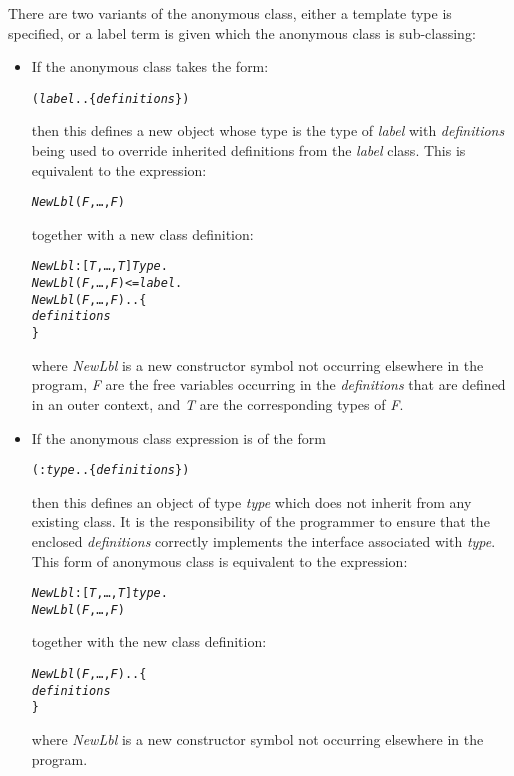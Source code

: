 There are two variants of the anonymous class, either a template type is specified, or a label term is given which the anonymous class is sub-classing:
\begin{itemize}
\item
If the anonymous class takes the form:
\begin{alltt}
(\emph{label}..\{ \emph{definitions} \})
\end{alltt}
then this defines a new object whose type is the type of \emph{label} with \emph{definitions} being used to override inherited definitions from the \emph{label} class. This is equivalent to the expression:
\begin{alltt}
\emph{NewLbl}(\emph{F},\ldots,\emph{F\subn})
\end{alltt}
together with a new class definition:
\begin{alltt}
\emph{NewLbl}:[\emph{T},\ldots,\emph{T}]\sconarrow{}\emph{Type}.
\emph{NewLbl}(\emph{F},\ldots,\emph{F\subn}) <= \emph{label}.
\emph{NewLbl}(\emph{F},\ldots,\emph{F\subn})..\{
  \emph{definitions}
\}
\end{alltt}
where \emph{NewLbl} is a new constructor symbol not occurring elsewhere in the program, \emph{F\subi} are the free variables occurring in the \emph{definitions} that are defined in an outer context, and \emph{T} are the corresponding types of \emph{F\subi}.
\item
If the anonymous class expression is of the form
\begin{alltt}
(:\emph{type}..\{ \emph{definitions} \})
\end{alltt}
then this defines an object of type \emph{type} which does not inherit from any existing class. It is the responsibility of the programmer to ensure that the enclosed \emph{definitions} correctly implements the interface associated with \emph{type}. This form of anonymous class is equivalent to the expression:
\begin{alltt}
\emph{NewLbl}:[\emph{T},\ldots,\emph{T}]\sconarrow{}\emph{type}.
\emph{NewLbl}(\emph{F},\ldots,\emph{F\subn})
\end{alltt}
together with the new class definition:
\begin{alltt}
\emph{NewLbl}(\emph{F},\ldots,\emph{F\subn})..\{
  \emph{definitions}
\}
\end{alltt}
where \emph{NewLbl} is a new constructor symbol not occurring elsewhere in the program.
\end{itemize}

